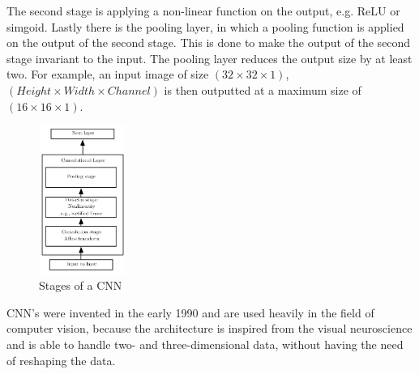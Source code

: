   The second stage is applying a non-linear function on the output, e.g. ReLU or simgoid.
  Lastly there is the pooling layer, in which a pooling function is applied on the output of the second stage. This is done to make the output of the second
  stage invariant to the input. The pooling layer reduces the output size by at least two. For example, an input image of size $(32 \times 32 \times 1)$,
  $(Height \times Width \times Channel)$ is then outputted at a maximum size of $(16 \times 16 \times 1)$.
  \begin{figure}[H]
   \includegraphics[width=0.25\textwidth]{../Images/convlayer.png}
   \centering
   \caption{Stages of a CNN \cite{Goodfellow2016}}
   \label{fig:cnn_stage}
  \end{figure}\noindent
  CNN's were invented in the early 1990 and are used heavily in the field of computer vision, because the architecture is inspired from the visual neuroscience
  and is able to handle two- and three-dimensional data, without having the need of reshaping the data. 
  
